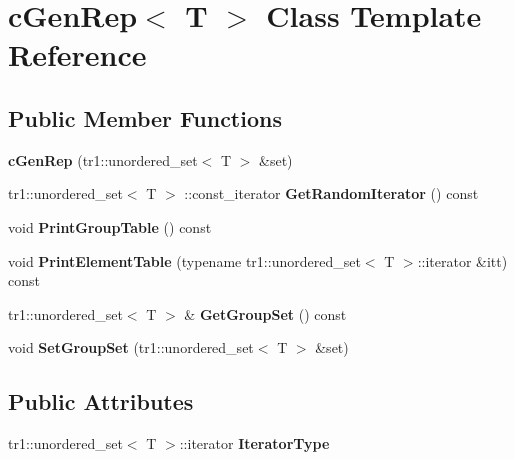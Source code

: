 \hypertarget{classcGenRep}{
\section{c\-Gen\-Rep$<$ \-T $>$ \-Class \-Template \-Reference}
\label{classcGenRep}
}
\subsection*{\-Public \-Member \-Functions}
\begin{DoxyCompactItemize}
\item 
\hypertarget{classcGenRep_afc45eb5aac4afa26288e4ef1b6dc3c52}{
{\bfseries c\-Gen\-Rep} (tr1\-::unordered\-\_\-set$<$ \-T $>$ \&set)}
\label{classcGenRep_afc45eb5aac4afa26288e4ef1b6dc3c52}

\item 
\hypertarget{classcGenRep_afb8d7535bcd9e4fda83eceb2a2633c2c}{
tr1\-::unordered\-\_\-set$<$ \-T $>$\*
\-::const\-\_\-iterator {\bfseries \-Get\-Random\-Iterator} () const }
\label{classcGenRep_afb8d7535bcd9e4fda83eceb2a2633c2c}

\item 
\hypertarget{classcGenRep_a9c5f078f3021dc2f8d2741bd9847146d}{
void {\bfseries \-Print\-Group\-Table} () const }
\label{classcGenRep_a9c5f078f3021dc2f8d2741bd9847146d}

\item 
\hypertarget{classcGenRep_a029b8b6099452ffd4dcab9e9ce79145b}{
void {\bfseries \-Print\-Element\-Table} (typename tr1\-::unordered\-\_\-set$<$ \-T $>$\-::iterator \&itt) const }
\label{classcGenRep_a029b8b6099452ffd4dcab9e9ce79145b}

\item 
\hypertarget{classcGenRep_aa94ce954bd3a2aabaa54d46642141df9}{
tr1\-::unordered\-\_\-set$<$ \-T $>$ \& {\bfseries \-Get\-Group\-Set} () const }
\label{classcGenRep_aa94ce954bd3a2aabaa54d46642141df9}

\item 
\hypertarget{classcGenRep_a38819c49300c51669a631399302ea130}{
void {\bfseries \-Set\-Group\-Set} (tr1\-::unordered\-\_\-set$<$ \-T $>$ \&set)}
\label{classcGenRep_a38819c49300c51669a631399302ea130}

\end{DoxyCompactItemize}
\subsection*{\-Public \-Attributes}
\begin{DoxyCompactItemize}
\item 
\hypertarget{classcGenRep_a94b066c9b99401b112085195c278b827}{
tr1\-::unordered\-\_\-set$<$ \-T $>$\-::iterator {\bfseries \-Iterator\-Type}}
\label{classcGenRep_a94b066c9b99401b112085195c278b827}

\end{DoxyCompactItemize}
